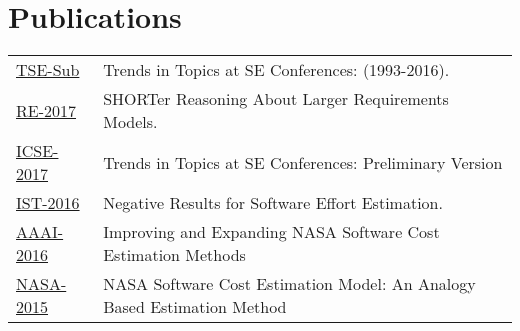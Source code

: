 \documentclass[]{bigfatnoob-resume}
\begin{document}
\begin{minipage}[t]{0.66\textwidth}

\section{Publications} 
\begin{tabular}{p{2cm}p{9.2cm}}
	\href{https://arxiv.org/abs/1608.08100}{TSE-Sub} & Trends in Topics at SE Conferences: (1993-2016).\\
	\href{https://arxiv.org/abs/1702.05568}{RE-2017} & SHORTer Reasoning About Larger Requirements Models.\\ 
	\href{https://arxiv.org/abs/1608.08100v1}{ICSE-2017} & Trends in Topics at SE Conferences: Preliminary Version\\
	\href{https://arxiv.org/abs/1609.05563}{IST-2016} & Negative Results for Software Effort Estimation.\\
	\href{http://ieeexplore.ieee.org/stamp/stamp.jsp?arnumber=7500655&tag=1}{AAAI-2016} & Improving and Expanding NASA Software Cost Estimation Methods \\
	\href{https://www.nasa.gov/sites/default/files/files/27_NASA_SC_SW_Cost_Model_final.pdf}{NASA-2015}  & NASA Software Cost Estimation Model: An Analogy Based Estimation Method\\
\end{tabular}
\sectionsep

\end{minipage} 
\end{document}
